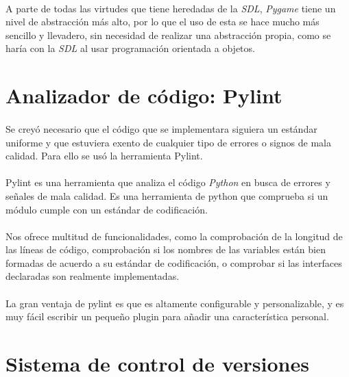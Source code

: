 \paragraph{}
A parte de todas las virtudes que tiene heredadas de la \emph{SDL}, \emph{Pygame} tiene un nivel de abstracción más alto, por lo que
el uso de esta se hace mucho más sencillo y llevadero, sin necesidad de realizar una abstracción propia, como se haría con la 
\emph{SDL} al usar programación orientada a objetos.

\section{Analizador de código: Pylint}

\paragraph{}
Se creyó necesario que el código que se implementara siguiera un estándar
uniforme y que estuviera exento de cualquier tipo de 
errores o signos de mala calidad. Para ello se usó la herramienta Pylint.

\paragraph{}
Pylint es una herramienta que analiza el código \emph{Python} en busca de errores y señales de mala calidad. Es una herramienta 
de python que comprueba si un módulo cumple con un estándar de codificación.

\paragraph{}
Nos ofrece multitud de funcionalidades, como la comprobación de la longitud de las líneas de código, comprobación si los nombres de 
las variables están bien formadas de acuerdo a su estándar de codificación, o comprobar si las interfaces declaradas son realmente 
implementadas.

\paragraph{}
La gran ventaja de pylint es que es altamente configurable y personalizable, y es muy fácil escribir un pequeño plugin para 
añadir una característica personal.

\section{Sistema de control de versiones}

